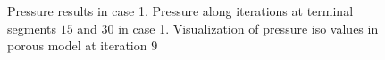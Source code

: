 \documentclass[a4paper, 11pt]{article} %
\begin{document}
\begin{figure}[hbtp]
\begin{center}

\caption{Pressure results in case 1. \protect{} Pressure along iterations at terminal segments $15$ and $30$ in case 1. \protect{} Visualization of pressure iso values in porous model at iteration $9$}
\label{fig:prcase1}
\end{center}
\end{figure}
\end{document}
